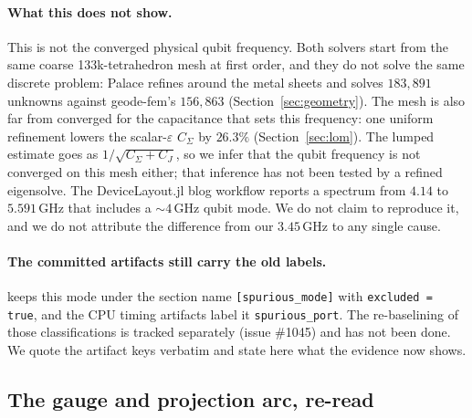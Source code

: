 \documentclass{anvil-paper}
\begin{document}
\paragraph{What this does not show.}
This is not the converged physical qubit frequency. Both solvers start
from the same coarse 133k-tetrahedron mesh at first order, and they do
not solve the same discrete problem: Palace refines around the metal
sheets and solves $183{,}891$ unknowns against geode-fem's $156{,}863$
(Section~\ref{sec:geometry}). The mesh is also far from converged for
the capacitance that sets this frequency: one uniform refinement lowers
the scalar-$\varepsilon$ $C_\Sigma$ by $26.3\%$
(Section~\ref{sec:lom}). The lumped estimate goes as
$1/\sqrt{C_\Sigma + C_J}$, so we infer that the qubit frequency is not
converged on this mesh either; that inference has not been tested by a
refined eigensolve. The DeviceLayout.jl blog workflow
\citep{devicelayout-blog} reports a spectrum from $4.14$ to
$5.591$\,GHz that includes a ${\sim}4$\,GHz qubit mode. We do not claim
to reproduce it, and we do not attribute the difference from our
$3.45$\,GHz to any single cause.

\paragraph{The committed artifacts still carry the old labels.}
 keeps this mode under the
section name \texttt{[spurious\_mode]} with \texttt{excluded = true}, and
the CPU timing artifacts label it \texttt{spurious\_port}. The
re-baselining of those classifications is tracked separately (issue
\#1045) and has not been done. We quote the artifact keys verbatim and
state here what the evidence now shows.

\subsection{The gauge and projection arc, re-read}
\label{sec:gauge-arc}
\end{document}
